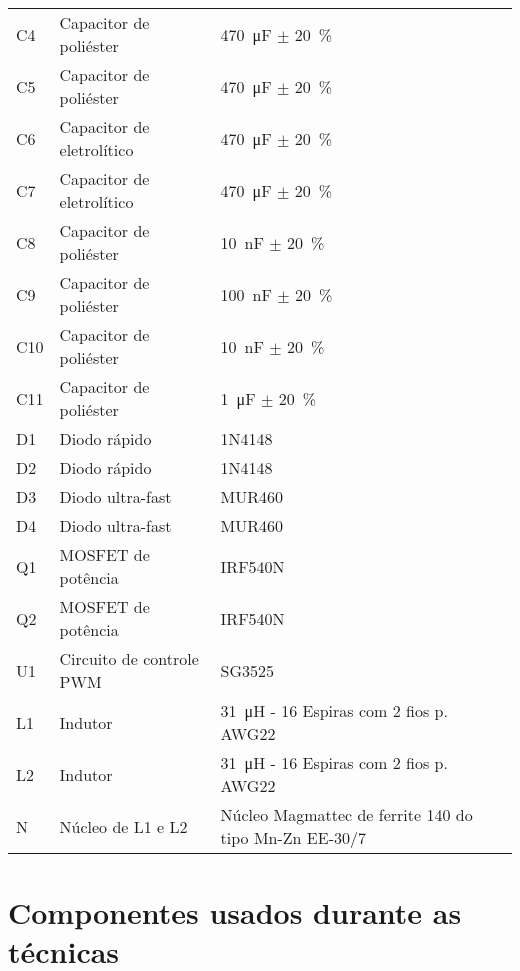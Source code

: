\begin{table}[htbp]
\begin{tabular}{@{}|m{}|m{}|m{}|@{}}
            C4	&	Capacitor de poliéster	    &	\qty{470}{\micro\farad} $\pm$ \qty{20}{\percent}\\
            C5	&	Capacitor de poliéster	    &	\qty{470}{\micro\farad} $\pm$ \qty{20}{\percent}\\
            C6	&	Capacitor de eletrolítico	&	\qty{470}{\micro\farad} $\pm$ \qty{20}{\percent}\\
            C7	&	Capacitor de eletrolítico	&	\qty{470}{\micro\farad} $\pm$ \qty{20}{\percent}\\
            C8	&	Capacitor de poliéster	    &	\qty{10}{\nano\farad} $\pm$ \qty{20}{\percent}\\
            C9	&	Capacitor de poliéster	    &	\qty{100}{\nano\farad} $\pm$ \qty{20}{\percent}\\
            C10	&	Capacitor de poliéster	    &	\qty{10}{\nano\farad} $\pm$ \qty{20}{\percent}\\
            C11	&	Capacitor de poliéster	    &	\qty{1}{\micro\farad} $\pm$ \qty{20}{\percent}\\
            D1	&	Diodo rápido                &	1N4148\\
            D2	&	Diodo rápido                &	1N4148\\
            D3	&	Diodo ultra-fast            &	MUR460\\
            D4	&	Diodo ultra-fast            &	MUR460\\
            Q1	&	MOSFET de potência          &	IRF540N\\
            Q2	&	MOSFET de potência          &	IRF540N\\
            U1	&	Circuito de controle PWM    &	SG3525\\
            L1	&	Indutor             	    &	\qty{31}{\micro\henry} - 16 Espiras com 2 fios p. AWG22  \\
            L2	&	Indutor             	    &	\qty{31}{\micro\henry} - 16 Espiras com 2 fios p. AWG22  \\
            N   &	Núcleo de L1 e L2           &	Núcleo Magmattec de ferrite 140 do tipo Mn-Zn EE-30/7 \\
            \hline
        \end{tabular}
    \end{table}

\chapter{Componentes usados durante as técnicas}

